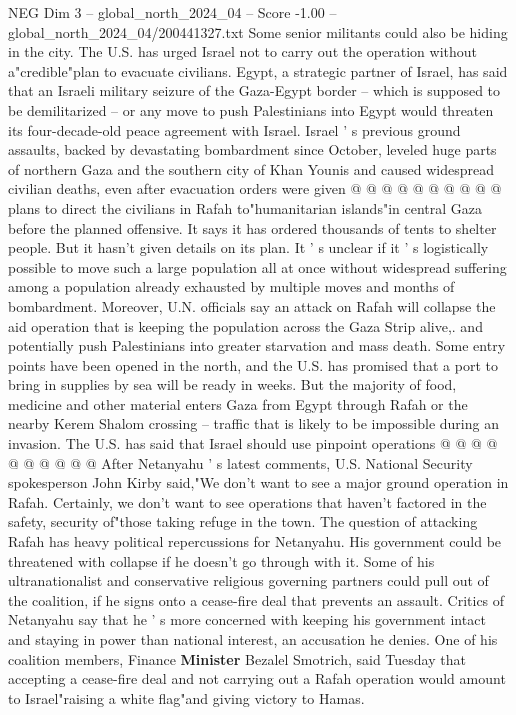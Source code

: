 \begin{textsample}{NEG Dim 3 – global\_north\_2024\_04 – Score -1.00 – global\_north\_2024\_04/200441327.txt}
Some senior militants could also be hiding in the city.
The U.S. has urged Israel not to carry out the operation without a"credible"plan to evacuate civilians.
Egypt, a strategic partner of Israel, has said that an Israeli military seizure of the Gaza-Egypt border -- which is supposed to be demilitarized -- or any move to push Palestinians into Egypt would threaten its four-decade-old peace agreement with Israel.
Israel ' s previous ground assaults, backed by devastating bombardment since October, leveled huge parts of northern Gaza and the southern city of Khan Younis and caused widespread civilian deaths, even after evacuation orders were given @ @ @ @ @ @ @ @ @ @ plans to direct the civilians in Rafah to"humanitarian islands"in central Gaza before the planned offensive.
It says it has ordered thousands of tents to shelter people.
But it hasn't given details on its plan.
It ' s unclear if it ' s logistically possible to move such a large population all at once without widespread suffering among a population already exhausted by multiple moves and months of bombardment.
Moreover, U.N. officials say an attack on Rafah will collapse the aid operation that is keeping the population across the Gaza Strip alive,. and potentially push Palestinians into greater starvation and mass death.
Some entry points have been opened in the north, and the U.S. has promised that a port to bring in supplies by sea will be ready in weeks.
But the majority of food, medicine and other material enters Gaza from Egypt through Rafah or the nearby Kerem Shalom crossing -- traffic that is likely to be impossible during an invasion.
The U.S. has said that Israel should use pinpoint operations @ @ @ @ @ @ @ @ @ @ After Netanyahu ' s latest comments, U.S.
National Security spokesperson John Kirby said,"We don't want to see a major ground operation in Rafah.
Certainly, we don't want to see operations that haven't factored in the safety, security of"those taking refuge in the town.
The question of attacking Rafah has heavy political repercussions for Netanyahu.
His government could be threatened with collapse if he doesn't go through with it.
Some of his ultranationalist and conservative religious governing partners could pull out of the coalition, if he signs onto a cease-fire deal that prevents an assault.
Critics of Netanyahu say that he ' s more concerned with keeping his government intact and staying in power than national interest, an accusation he denies.
One of his coalition members, Finance \textbf{Minister} Bezalel Smotrich, said Tuesday that accepting a cease-fire deal and not carrying out a Rafah operation would amount to Israel"raising a white flag"and giving victory to Hamas.

\end{textsample}
